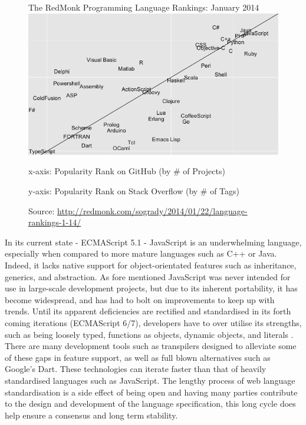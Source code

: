 \documentclass[final]{cmpreport}
\begin{document}

\begin{figure}[h!]{The RedMonk Programming Language Rankings: January 2014 \label{ranking}}
  \includegraphics[width=1.0\textwidth]{lang-rank-114-wm.png}
  \begin{tablenotes}
    \item x-axis: Popularity Rank on GitHub (by \# of Projects)
    \item y-axis: Popularity Rank on Stack Overflow (by \# of Tags)
    \item Source: \url{http://redmonk.com/sogrady/2014/01/22/language-rankings-1-14/}
  \end{tablenotes}
\end{figure}

 In its current state - ECMAScript 5.1 - JavaScript is an underwhelming language, especially when compared to more mature languages such as C++ or Java. Indeed, it lacks native support for object-orientated features such as inheritance, generics, and abstraction. As fore mentioned JavaScript was never intended for use in large-scale development projects, but due to its inherent portability, it has become widespread, and has had to bolt on improvements to keep up with trends. Until its apparent deficiencies are rectified and standardised in its forth coming iterations (ECMAScript 6/7), developers have to over utilise its strengths, such as being loosely typed, functions as objects, dynamic objects, and literals \citep{Julian}. There are many development tools such as transpilers designed to alleviate some of these gaps in feature support, as well as full blown alternatives such as Google's Dart. These technologies can iterate faster than that of heavily standardised languages such as JavaScript. The lengthy process of web language standardisation is a side effect of being open and having many parties contribute to the design and development of the language specification, this long cycle does help ensure a consensus and long term stability.
\end{document}
